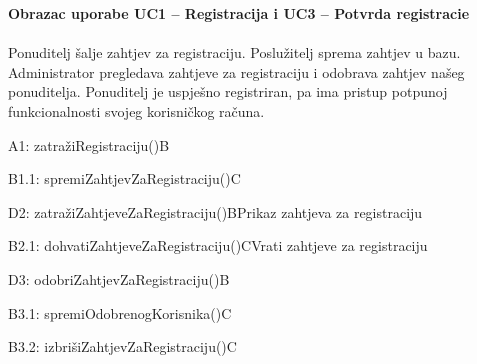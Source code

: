 				\textbf{Obrazac uporabe UC1 – Registracija i UC3 – Potvrda registracie}\\\\
				Ponuditelj šalje zahtjev za registraciju. Poslužitelj sprema zahtjev u bazu. Administrator pregledava zahtjeve za registraciju i odobrava zahtjev našeg ponuditelja. Ponuditelj je uspješno registriran, pa ima pristup potpunoj funkcionalnosti svojeg korisničkog računa.\\
				\begin{center}
					\begin{adjustbox}{max width=\textwidth}
						\begin{sequencediagram}
							\begin{messcall}{A}{1: zatražiRegistraciju()}{B}
								\begin{messcall}{B}{1.1: spremiZahtjevZaRegistraciju()}{C}
								\end{messcall}
							\end{messcall}
							\begin{call}{D}{2: zatražiZahtjeveZaRegistraciju()}{B}{Prikaz zahtjeva za registraciju}
								\postlevel
								\begin{call}{B}{2.1: dohvatiZahtjeveZaRegistraciju()}{C}{Vrati zahtjeve za registraciju}
								\end{call}
								\postlevel
							\end{call}
							\postlevel
							\begin{messcall}{D}{3: odobriZahtjevZaRegistraciju()}{B}
								\postlevel
								\begin{messcall}{B}{3.1: spremiOdobrenogKorisnika()}{C}
								\end{messcall}
								\begin{messcall}{B}{3.2: izbrišiZahtjevZaRegistraciju()}{C}
								\end{messcall}
							\end{messcall}
						\end{sequencediagram}
					\end{adjustbox}
				\end{center}
				\eject
				
